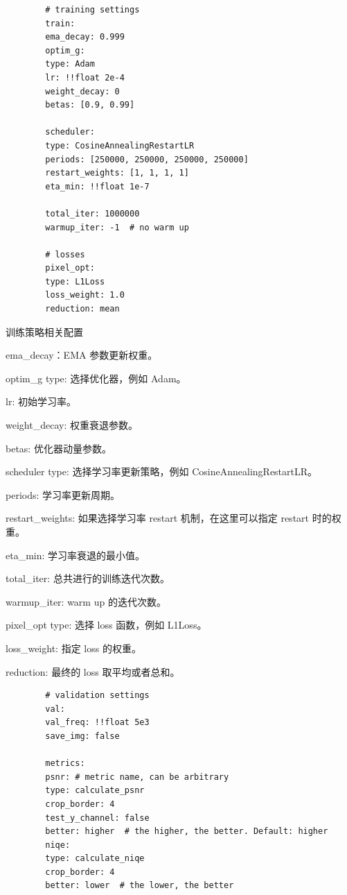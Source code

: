 \documentclass[../main.tex]{subfiles}
\begin{document}
	\begin{verbatim}
		# training settings
		train:
		ema_decay: 0.999
		optim_g:
		type: Adam
		lr: !!float 2e-4
		weight_decay: 0
		betas: [0.9, 0.99]
		
		scheduler:
		type: CosineAnnealingRestartLR
		periods: [250000, 250000, 250000, 250000]
		restart_weights: [1, 1, 1, 1]
		eta_min: !!float 1e-7
		
		total_iter: 1000000
		warmup_iter: -1  # no warm up
		
		# losses
		pixel_opt:
		type: L1Loss
		loss_weight: 1.0
		reduction: mean
	\end{verbatim}
	\begin{exampleBox}[righthand ratio=0.00, sidebyside, sidebyside align=center, lower separated=false]{训练策略相关配置}
		
		ema\_decay：EMA 参数更新权重。
		
		optim\_g type: 选择优化器，例如 Adam。
		
		lr: 初始学习率。
		
		weight\_decay: 权重衰退参数。
		
		betas: 优化器动量参数。
		
		scheduler type: 选择学习率更新策略，例如 CosineAnnealingRestartLR。
		
		periods: 学习率更新周期。
		
		restart\_weights: 如果选择学习率 restart 机制，在这里可以指定 restart 时的权重。
		
		eta\_min: 学习率衰退的最小值。
		
		total\_iter: 总共进行的训练迭代次数。
		
		warmup\_iter: warm up 的迭代次数。
		
		pixel\_opt type: 选择 loss 函数，例如 L1Loss。
		
		loss\_weight: 指定 loss 的权重。
		
		reduction: 最终的 loss 取平均或者总和。
		
	\end{exampleBox}
	\begin{verbatim}
		# validation settings
		val:
		val_freq: !!float 5e3
		save_img: false
		
		metrics:
		psnr: # metric name, can be arbitrary
		type: calculate_psnr
		crop_border: 4
		test_y_channel: false
		better: higher  # the higher, the better. Default: higher
		niqe:
		type: calculate_niqe
		crop_border: 4
		better: lower  # the lower, the better
	\end{verbatim}
\end{document}

